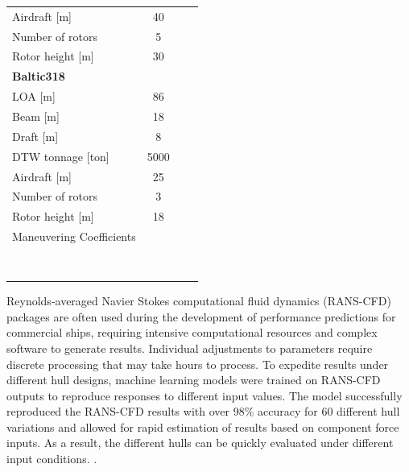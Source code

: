 \documentclass[twoside,twocolumn]{article}
\begin{document}
\begin{table}[!th]
\begin{tabular}{lSSS}
		Airdraft [m]              & 40      &         &                \\
		Number of rotors          & 5       &         &                \\
		Rotor height [m]          & 30      &         &                \\ \bigskip
		\textbf{Baltic318}                 &         &         &                \\ \midrule[1pt]
		LOA [m]                   & 86      &         &                \\
		Beam [m]                  & 18      &         &                \\
		Draft [m]                 & 8       &         &                \\
		DTW tonnage [ton]         & 5000    &         &                \\
		Airdraft [m]              & 25      &         &                \\
		Number of rotors          & 3       &         &                \\
		Rotor height [m]          & 18      &         & \smallskip     \\
		Maneuvering Coefficients  &         &         &                \\ \midrule
		\Fn                       & &&        \\
		\Xbb                      & &&        \\
		\Xphiphi                  & &&        \\
		\Yb                       & &&        \\
		\Ybbb                     & &&        \\
		\Yphi                     & &&        \\
		\Nb                       & &&        \\
		\Nphi                     & && \\ \bottomrule
	\end{tabular}
	\label{tab:mainparticularsA}
\end{table}

Reynolds-averaged Navier Stokes computational fluid dynamics (RANS-CFD) packages are often used during the development of performance predictions for commercial ships, requiring intensive computational resources and complex software to generate results. Individual adjustments to parameters require discrete processing that may take hours to process. To expedite results under different hull designs, machine learning models were trained on RANS-CFD outputs to reproduce responses to different input values. The model successfully reproduced the RANS-CFD results with over 98\% accuracy for 60 different hull variations and allowed for rapid estimation of results based on component force inputs. As a result, the different hulls can be quickly evaluated under different input conditions. \citep{Freeman2018}.
\end{document}
